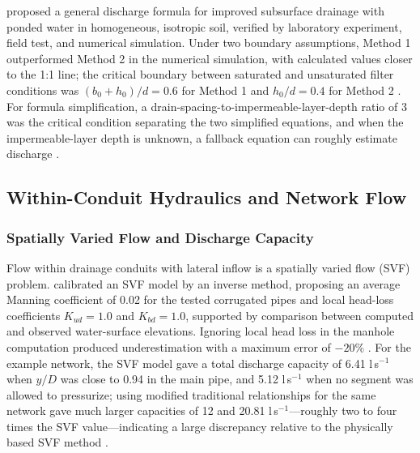 \textcite{Tao2019} proposed a general discharge formula for improved subsurface drainage
with ponded water in homogeneous, isotropic soil, verified by laboratory experiment, field
test, and numerical simulation. Under two boundary assumptions, Method 1 outperformed
Method 2 in the numerical simulation, with calculated values closer to the 1:1 line; the
critical boundary between saturated and unsaturated filter conditions was
$(b_0 + h_0)/d = 0.6$ for Method 1 and $h_0/d = 0.4$ for Method 2 \parencite{Tao2019}. For
formula simplification, a drain-spacing-to-impermeable-layer-depth ratio of 3 was the
critical condition separating the two simplified equations, and when the impermeable-layer
depth is unknown, a fallback equation can roughly estimate discharge \parencite{Tao2019}.

\subsection{Within-Conduit Hydraulics and Network Flow}

\subsubsection{Spatially Varied Flow and Discharge Capacity}

Flow within drainage conduits with lateral inflow is a spatially varied flow (SVF)
problem. \textcite{Bayat2011} calibrated an SVF model by an inverse method, proposing an
average Manning coefficient of 0.02 for the tested corrugated pipes and local head-loss
coefficients $K_{ud} = 1.0$ and $K_{bd} = 1.0$, supported by comparison between computed
and observed water-surface elevations. Ignoring local head loss in the manhole computation
produced underestimation with a maximum error of $-20\%$ \parencite{Bayat2011}. For the
example network, the SVF model gave a total discharge capacity of 6.41 l\,s$^{-1}$ when
$y/D$ was close to 0.94 in the main pipe, and 5.12 l\,s$^{-1}$ when no segment was allowed
to pressurize; using modified traditional relationships for the same network gave much
larger capacities of 12 and 20.81 l\,s$^{-1}$---roughly two to four times the SVF
value---indicating a large discrepancy relative to the physically based SVF method
\parencite{Bayat2011}.

